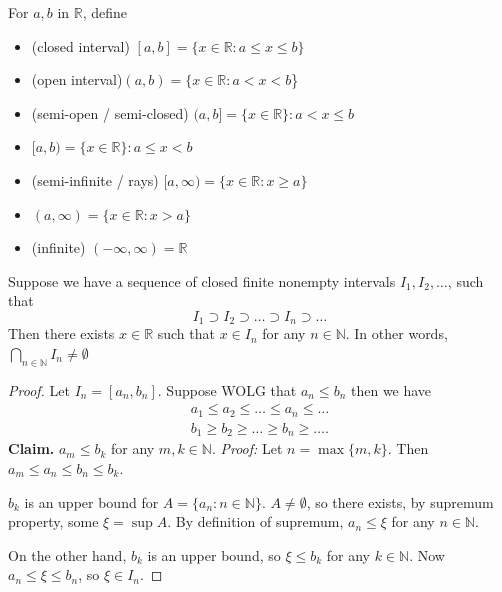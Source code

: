 \begin{definition}[interval]
	For $a,b$ in $\mathbb{R}$, define 
	\begin{itemize}
		\item (closed interval) $[a,b] = \{x \in \mathbb{R}: a \le x\le b\} $ 
		\item (open interval)$(a,b) = \{x \in \mathbb{R}: a < x <  b$\} 
		\item  (semi-open / semi-closed) $(a,b] = \{x \in \mathbb{R}\} : a < x \le  b$
		\item  $[a,b) = \{x \in \mathbb{R}\} : a \le  x  < b$
		\item (semi-infinite / rays) $[a,\infty ) = \{x \in \mathbb{R}: x \ge a\} $
		\item  $(a,\infty ) = \{x \in \mathbb{R}: x > a\} $ 
		\item (infinite) $(-\infty , \infty) = \mathbb{R}$
	\end{itemize}
\end{definition}

\begin{theorem}
	Suppose we have a sequence of closed finite nonempty intervals $I_1, I_2, \ldots$, such that \[
	I_1 \supset I_2 \supset \ldots \supset I_n \supset \ldots
\]
Then there exists $x \in \mathbb{R}$ such that $x \in I_n$ for any $n \in  \mathbb{N}$. In other words, $\bigcap_{n \in \mathbb{N}} I_n \neq  \emptyset  $
\end{theorem}
\begin{proof}
	Let $I_n = \left[ a_n, b_n \right] $. Suppose WOLG that $a_n \le b_n$ then we have
\begin{align*}
	a_1\le a_2\le \ldots\le a_n \le \ldots \\
	b_1\ge b_2\ge \ldots\ge b_n \ge \ldots 
.\end{align*}
\textbf{Claim.} $a_m \le  b_k $ for any $m, k \in \mathbb{N}$. \textit{Proof:} Let $n = \max \{m,k\} $. Then $a_m \le a_n \le b_n \le b_k$.

$b_k$ is an upper bound for $A = \{a_n : n \in \mathbb{N}\} $. $A\neq \emptyset $, so there exists, by supremum property, some $\xi = \operatorname{sup} A$. By definition of supremum, $a_n \le  \xi$ for any $ n \in \mathbb{N}$.

On the other hand, $b_k$ is an upper bound, so $\xi \le b_k$ for any $k \in \mathbb{N}$. Now $a_n \le \xi \le b_n$, so $\xi \in I_n$.
\end{proof}

